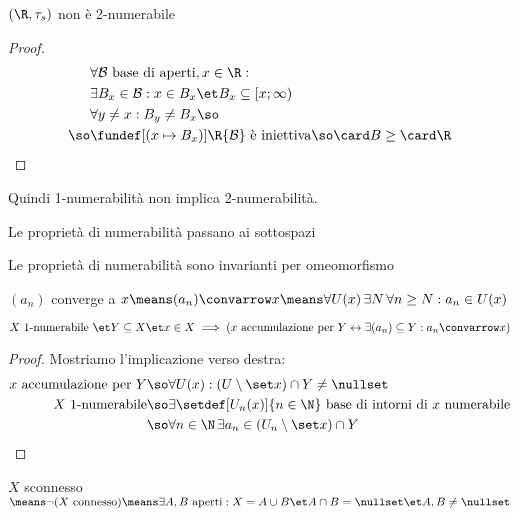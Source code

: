 \begin{prop}
$(\R,\tau_s)$ non è 2-numerabile
\end{prop}
\begin{proof}
\begin{align*}
&\forall\mathcal B\text{ base di aperti},x\in\R:\\
&\exists B_x\in\mathcal B:x\in B_x\et B_x\subseteq [x;\infty)\\
&\forall y\neq x:B_y\neq B_x\so\\
\so&\fundef[(x\mapsto B_x)]\R{\mathcal B}\text{ è iniettiva}\so\card B\geq\card\R \qedhere
\end{align*}
\end{proof}

\begin{oss}
Quindi 1-numerabilità non implica 2-numerabilità.
\end{oss}

\begin{prop}
Le proprietà di numerabilità passano ai sottospazi
\end{prop}

\begin{prop}
Le proprietà di numerabilità sono invarianti per omeomorfismo
\end{prop}

\begin{defn}[Convergenza]
$(a_n)$ converge a $x\means(a_n)\convarrow x\means\forall U(x)\,\exists N\,\forall n\geq N:a_n\in U(x)$
\end{defn}

\begin{prop}
$X\text{ 1-numerabile }\et Y\subseteq X\et x\in X\implies(x\text{ accumulazione per }Y\leftrightarrow\exists(a_n)\subseteq Y:a_n\convarrow x)$
\end{prop}
\begin{proof}
Mostriamo l'implicazione verso destra:
\begin{align*}
x\text{ accumulazione per }Y\so&\forall U(x):(U\setminus\set x)\cap Y\neq\nullset\\
X\text{ 1-numerabile}\so&\exists\setdef[U_n(x)]{n\in\N}\text{ base di intorni di }x\text{ numerabile}\\
\so&\forall n\in\N\,\exists a_n\in(U_n\setminus\set x)\cap Y \qedhere
\end{align*}
\end{proof}


\begin{defn}[Connessione]
$X$ sconnesso $\means\neg(X\text{ connesso})\means\exists A,B\text{ aperti}:X=A\cup B\et A\cap B=\nullset\et A,B\neq\nullset$
\end{defn}

